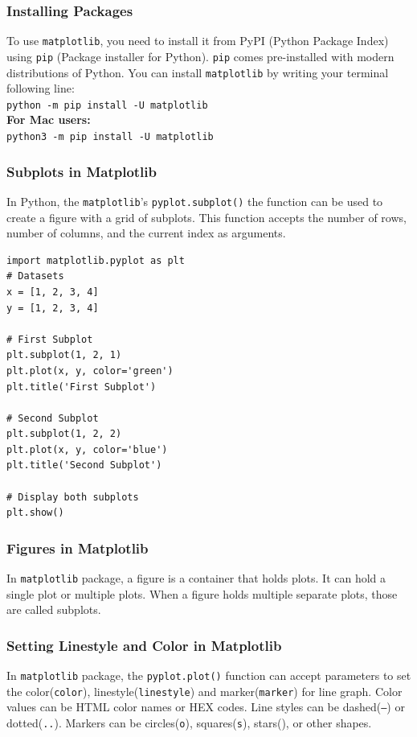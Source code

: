 \documentclass[a4paper]{article}
\begin{document}
\subsubsection{Installing Packages}
To use \texttt{matplotlib}, you need to install it from PyPI (Python Package Index) using \texttt{pip} (Package installer for Python). \texttt{pip} comes pre-installed with modern distributions of Python. You can install \texttt{matplotlib} by writing your terminal following line: \\
\texttt{python -m pip install -U matplotlib} \\
\textbf{For Mac users:}\\
\texttt{python3 -m pip install -U matplotlib}

\subsubsection{Subplots in Matplotlib}
In Python, the \texttt{matplotlib}’s \texttt{pyplot.subplot()} the function can be used to create a figure with a grid of subplots. This function accepts the number of rows, number of columns, and the current index as arguments.

\begin{lstlisting}[caption={}]
import matplotlib.pyplot as plt
# Datasets
x = [1, 2, 3, 4]
y = [1, 2, 3, 4]

# First Subplot
plt.subplot(1, 2, 1)
plt.plot(x, y, color='green')
plt.title('First Subplot')

# Second Subplot
plt.subplot(1, 2, 2)
plt.plot(x, y, color='blue')
plt.title('Second Subplot')

# Display both subplots
plt.show()
\end{lstlisting}

\subsubsection{Figures in Matplotlib}
In \texttt{matplotlib} package, a figure is a container that holds plots. It can hold a single plot or multiple plots. When a figure holds multiple separate plots, those are called subplots.

\subsubsection{Setting Linestyle and Color in Matplotlib}
In \texttt{matplotlib} package, the \texttt{pyplot.plot()} function can accept parameters to set the color(\texttt{color}), linestyle(\texttt{linestyle}) and marker(\texttt{marker}) for line graph. Color values can be HTML color names or HEX codes. Line styles can be dashed(\texttt{\textquotesingle --\textquotesingle}) or dotted(\texttt{\textquotesingle ..\textquotesingle}). Markers can be circles(\texttt{\textquotesingle o\textquotesingle}), squares(\texttt{\textquotesingle s\textquotesingle}), stars(\texttt{\textquotesingle *\textquotesingle}), or other shapes.
\end{document}
